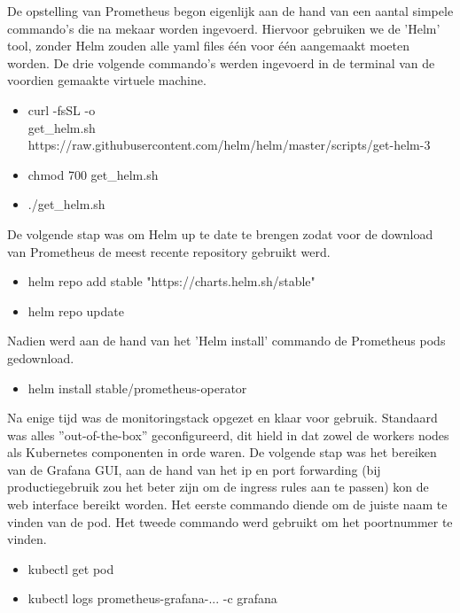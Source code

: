 De opstelling van Prometheus begon eigenlijk aan de hand van een aantal simpele commando's die na mekaar worden ingevoerd. Hiervoor gebruiken we de 'Helm' tool, zonder Helm zouden alle yaml files één voor één aangemaakt moeten worden. De drie volgende commando's werden ingevoerd in de terminal van de voordien gemaakte virtuele machine. 

\begin{itemize}
    \item curl -fsSL -o \\ 
    get\_helm.sh https://raw.githubusercontent.com/helm/helm/master/scripts/get-helm-3
    \item chmod 700 get\_helm.sh
    \item ./get\_helm.sh
\end{itemize}

De volgende stap was om Helm up te date te brengen zodat voor de download van Prometheus de meest recente repository gebruikt werd.

\begin{itemize}
    \item helm repo add stable "https://charts.helm.sh/stable"
    \item helm repo update
\end{itemize}

Nadien werd aan de hand van het 'Helm install' commando de Prometheus pods gedownload.

\begin{itemize}
    \item helm install stable/prometheus-operator
\end{itemize}

Na enige tijd was de monitoringstack opgezet en klaar voor gebruik. Standaard was alles ''out-of-the-box'' geconfigureerd, dit hield in dat zowel de workers nodes als Kubernetes componenten in orde waren. De volgende stap was het bereiken van de Grafana GUI, aan de hand van het ip en port forwarding (bij productiegebruik zou het beter zijn om de ingress rules aan te passen) kon de web interface bereikt worden. Het eerste commando diende om de juiste naam te vinden van de pod. Het tweede commando werd gebruikt om het poortnummer te vinden.

\begin{itemize}
    \item kubectl get pod
    \item kubectl logs prometheus-grafana-... -c grafana
\end{itemize}

